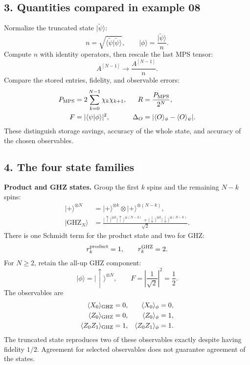 \documentclass[11pt]{article}
\newcommand{\ket}[1]{\lvert #1\rangle}
\begin{document}
\newpage
\subsection*{3. Quantities compared in example 08}
Normalize the truncated state $\ket{\widetilde\psi}$:
\begin{equation}
n=\sqrt{\langle\widetilde\psi|\widetilde\psi\rangle},\qquad
\ket\phi=\frac{\ket{\widetilde\psi}}{n}.
\end{equation}
Compute $n$ with identity operators, then rescale the last MPS tensor:
\begin{equation}
A^{[N-1]}\longrightarrow\frac{A^{[N-1]}}{n}.
\end{equation}
Compare the stored entries, fidelity, and observable errors:
\begin{align}
P_{\rm MPS}&=2\sum_{k=0}^{N-1}\chi_k\chi_{k+1},
&R&=\frac{P_{\rm MPS}}{2^N},\\
F&=|\langle\psi|\phi\rangle|^2,
&\Delta_O&=|\langle O\rangle_\phi-\langle O\rangle_\psi|.
\end{align}
These distinguish storage savings, accuracy of the whole state, and accuracy of the chosen observables.

\subsection*{4. The four state families}
\textbf{Product and GHZ states.} Group the first $k$ spins and the remaining $N-k$ spins:
\begin{align}
\ket+^{\otimes N}&=\ket+^{\otimes k}\otimes\ket+^{\otimes(N-k)},\\
\ket{\mathrm{GHZ}_N}
&=\frac{\ket\uparrow^{\otimes k}\ket\uparrow^{\otimes(N-k)}
+\ket\downarrow^{\otimes k}\ket\downarrow^{\otimes(N-k)}}{\sqrt2}.
\end{align}
There is one Schmidt term for the product state and two for GHZ:
\begin{equation}
r_k^{\rm product}=1,\qquad r_k^{\rm GHZ}=2.
\end{equation}
For $N\geq2$, retain the all-up GHZ component:
\begin{equation}
\ket\phi=\ket\uparrow^{\otimes N},\qquad
F=\left|\frac1{\sqrt2}\right|^2=\frac12.
\end{equation}
The observables are
\begin{align}
\langle X_0\rangle_{\rm GHZ}&=0,&\langle X_0\rangle_\phi&=0,\\
\langle Z_0\rangle_{\rm GHZ}&=0,&\langle Z_0\rangle_\phi&=1,\\
\langle Z_0Z_1\rangle_{\rm GHZ}&=1,&\langle Z_0Z_1\rangle_\phi&=1.
\end{align}
The truncated state reproduces two of these observables exactly despite having fidelity $1/2$. Agreement for selected observables does not guarantee agreement of the states.
\end{document}
